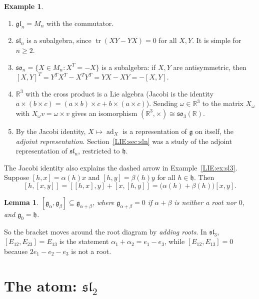 \documentclass[11pt,openany]{book}
\theoremstyle{plain}
\newtheorem{lemma}[theorem]{Lemma}
\theoremstyle{definition}
\newtheorem{example}[theorem]{Example}
\theoremstyle{remark}
\newcommand{\R}{\mathbb{R}}
\begin{document}
\begin{example}\leavevmode
\begin{enumerate}[nosep]
\item $\mathfrak{gl}_n=M_n$ with the commutator.
\item $\mathfrak{sl}_n$ is a subalgebra, since $\operatorname{tr}(XY-YX)=0$ for all $X,Y$. It is simple for
  $n\ge2$.
\item $\mathfrak{so}_n=\{X\in M_n: X^T=-X\}$ is a subalgebra: if $X,Y$ are antisymmetric, then
  $[X,Y]^T=Y^TX^T-X^TY^T=YX-XY=-[X,Y]$.
\item $\R^3$ with the cross product is a Lie algebra (Jacobi is the identity
  $a\times(b\times c)=(a\times b)\times c+b\times(a\times c)$). Sending $\omega\in\R^3$ to the matrix
  $X_\omega$ with $X_\omega v=\omega\times v$ gives an isomorphism $(\R^3,\times)\cong\mathfrak{so}_3(\R)$.
\item By the Jacobi identity, $X\mapsto\operatorname{ad}_X$ is a representation of $\mathfrak g$ on itself,
  the \emph{adjoint representation}. Section~\ref{LIE:sec:sln} was a study of the adjoint
  representation of $\mathfrak{sl}_n$, restricted to $\mathfrak h$.
\end{enumerate}
\end{example}

The Jacobi identity also explains the dashed arrow in Example~\ref{LIE:ex:sl3}. Suppose
$[h,x]=\alpha(h)x$ and $[h,y]=\beta(h)y$ for all $h\in\mathfrak h$. Then
\[
  [h,[x,y]]=[[h,x],y]+[x,[h,y]]=\big(\alpha(h)+\beta(h)\big)[x,y].
\]

\begin{lemma}\label{LIE:lem:add}
$[\mathfrak g_\alpha,\mathfrak g_\beta]\subseteq\mathfrak g_{\alpha+\beta}$, where
$\mathfrak g_{\alpha+\beta}=0$ if $\alpha+\beta$ is neither a root nor $0$, and $\mathfrak g_0=\mathfrak h$.
\end{lemma}

So the bracket moves around the root diagram by \emph{adding roots}. In $\mathfrak{sl}_3$,
$[E_{12},E_{23}]=E_{13}$ is the statement $\alpha_1+\alpha_2=e_1-e_3$, while $[E_{12},E_{13}]=0$
because $2e_1-e_2-e_3$ is not a root.

\section{The atom: \texorpdfstring{$\mathfrak{sl}_2$}{sl(2)}}
\label{LIE:sec:sl2}
\end{document}
